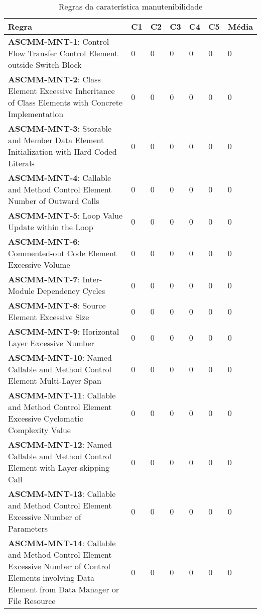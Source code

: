 \documentclass[openany,10pt,a4paper]{article}
\begin{document}
\begin{table}[h]
	\centering
	\caption{Regras da caraterística manutenibilidade}
	\begin{tabular}{|p{3in}|p{0.3in}|p{0.3in}|p{0.3in}|p{0.3in}|p{0.3in}|p{0.4in}|}
		\hline	
		\textbf{Regra} & \textbf{C1} & \textbf{C2} & \textbf{C3} & \textbf{C4} & \textbf{C5} & \textbf{Média} \\ \hline
		\textbf{ASCMM-MNT-1}: Control Flow Transfer Control Element outside Switch Block & 0 & 0 & 0 & 0 & 0 & 0 \\ \hline
\textbf{ASCMM-MNT-2}: Class Element Excessive Inheritance of Class Elements with Concrete Implementation & 0 & 0 & 0 & 0 & 0 & 0 \\ \hline
\textbf{ASCMM-MNT-3}: Storable and Member Data Element Initialization with Hard-Coded Literals & 0 & 0 & 0 & 0 & 0 & 0 \\ \hline
\textbf{ASCMM-MNT-4}: Callable and Method Control Element Number of Outward Calls & 0 & 0 & 0 & 0 & 0 & 0 \\ \hline
\textbf{ASCMM-MNT-5}: Loop Value Update within the Loop & 0 & 0 & 0 & 0 & 0 & 0 \\ \hline
\textbf{ASCMM-MNT-6}: Commented-out Code Element Excessive Volume & 0 & 0 & 0 & 0 & 0 & 0 \\ \hline
\textbf{ASCMM-MNT-7}: Inter-Module Dependency Cycles & 0 & 0 & 0 & 0 & 0 & 0 \\ \hline
\textbf{ASCMM-MNT-8}: Source Element Excessive Size & 0 & 0 & 0 & 0 & 0 & 0 \\ \hline
\textbf{ASCMM-MNT-9}: Horizontal Layer Excessive Number & 0 & 0 & 0 & 0 & 0 & 0 \\ \hline
\textbf{ASCMM-MNT-10}: Named Callable and Method Control Element Multi-Layer Span & 0 & 0 & 0 & 0 & 0 & 0 \\ \hline
\textbf{ASCMM-MNT-11}: Callable and Method Control Element Excessive Cyclomatic Complexity Value & 0 & 0 & 0 & 0 & 0 & 0 \\ \hline
\textbf{ASCMM-MNT-12}: Named Callable and Method Control Element with Layer-skipping Call & 0 & 0 & 0 & 0 & 0 & 0 \\ \hline
\textbf{ASCMM-MNT-13}: Callable and Method Control Element Excessive Number of Parameters & 0 & 0 & 0 & 0 & 0 & 0 \\ \hline
\textbf{ASCMM-MNT-14}: Callable and Method Control Element Excessive Number of Control Elements involving Data Element from Data Manager or File Resource & 0 & 0 & 0 & 0 & 0 & 0 \\ \hline

\end{tabular}
\end{table}
\end{document}
